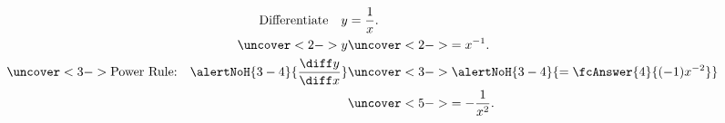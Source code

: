 \begin{frame}
\begin{example}
\abovedisplayskip=0pt
\belowdisplayskip=-15pt
\abovedisplayshortskip=0pt
\belowdisplayshortskip=0pt
\begin{align*}
\text{Differentiate}\quad y & = \frac{1}{x}.\\%
\uncover<2->{%
y %
}%
& \uncover<2->{%
 = x^{-1}.
}\\%
\uncover<3->{%
\text{Power Rule:}\quad %
\alertNoH{ 3-4}{\frac{\diff y}{\diff x}} %
}%
& \uncover<3->{%
\alertNoH{ 3-4}{ = \fcAnswer{4}{(-1)x^{-2}}}
}\\%
& \uncover<5->{%
 =  -\frac{1}{x^2}.%
}%
\end{align*}
\end{example}
\end{frame}
